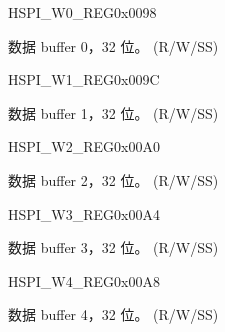 \begin{register}{H}{SPI\_W0\_REG}{0x0098}\label{regdesc:SPIW0REG}
%
\regnewline%
\begin{regdesc}\begin{reglist}
\label{fielddesc:SPIBUF0}\item [SPI\_BUF0] 数据 buffer 0，32 位。 (R/W/SS)
\end{reglist}\end{regdesc}
\end{register}


\begin{register}{H}{SPI\_W1\_REG}{0x009C}\label{regdesc:SPIW1REG}
%
\regnewline%
\begin{regdesc}\begin{reglist}
\label{fielddesc:SPIBUF1}\item [SPI\_BUF1] 数据 buffer 1，32 位。 (R/W/SS)
\end{reglist}\end{regdesc}
\end{register}


\begin{register}{H}{SPI\_W2\_REG}{0x00A0}\label{regdesc:SPIW2REG}
%
\regnewline%
\begin{regdesc}\begin{reglist}
\label{fielddesc:SPIBUF2}\item [SPI\_BUF2] 数据 buffer 2，32 位。 (R/W/SS)
\end{reglist}\end{regdesc}
\end{register}


\begin{register}{H}{SPI\_W3\_REG}{0x00A4}\label{regdesc:SPIW3REG}
%
\regnewline%
\begin{regdesc}\begin{reglist}
\label{fielddesc:SPIBUF3}\item [SPI\_BUF3] 数据 buffer 3，32 位。 (R/W/SS)
\end{reglist}\end{regdesc}
\end{register}


\begin{register}{H}{SPI\_W4\_REG}{0x00A8}\label{regdesc:SPIW4REG}
%
\regnewline%
\begin{regdesc}\begin{reglist}
\label{fielddesc:SPIBUF4}\item [SPI\_BUF4] 数据 buffer 4，32 位。 (R/W/SS)
\end{reglist}\end{regdesc}
\end{register}


